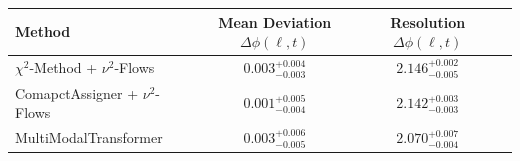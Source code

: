     \begin{tabular}{lccc}
        \toprule
        Method & Mean Deviation $\Delta\phi(\ell, t)$ & Resolution $\Delta\phi(\ell, t)$ \\
        \midrule
        $\chi^2$-Method + $\nu^2$-Flows & $0.003^{+0.004}_{-0.003}$ & $2.146^{+0.002}_{-0.005}$ \\
        ComapctAssigner + $\nu^2$-Flows & $0.001^{+0.005}_{-0.004}$ & $2.142^{+0.003}_{-0.003}$ \\
        MultiModalTransformer & $0.003^{+0.006}_{-0.005}$ & $2.070^{+0.007}_{-0.004}$ \\
        \bottomrule
    \end{tabular}